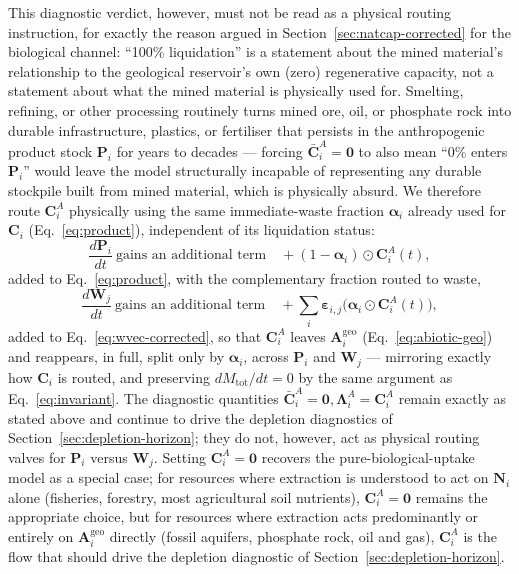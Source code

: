 \documentclass[twocolumn,10pt]{article}
\begin{document}
This diagnostic verdict, however, must not be read as a physical routing instruction, for exactly the reason argued in Section~\ref{sec:natcap-corrected} for the biological channel: ``100\% liquidation'' is a statement about the mined material's relationship to the geological reservoir's own (zero) regenerative capacity, not a statement about what the mined material is physically used for. Smelting, refining, or other processing routinely turns mined ore, oil, or phosphate rock into durable infrastructure, plastics, or fertiliser that persists in the anthropogenic product stock $\mathbf P_i$ for years to decades — forcing $\bar{\mathbf C}^A_i=\mathbf 0$ to also mean ``0\% enters $\mathbf P_i$'' would leave the model structurally incapable of representing any durable stockpile built from mined material, which is physically absurd. We therefore route $\mathbf C^A_i$ physically using the same immediate-waste fraction $\boldsymbol\alpha_i$ already used for $\mathbf C_i$ (Eq.~\eqref{eq:product}), independent of its liquidation status:
\[
\frac{d\mathbf P_i}{dt}\ \text{gains an additional term}\quad +(1-\boldsymbol\alpha_i)\odot\mathbf C^A_i(t),
\]
added to Eq.~\eqref{eq:product}, with the complementary fraction routed to waste,
\[
\frac{d\mathbf W_j}{dt}\ \text{gains an additional term}\quad +\sum_i\boldsymbol\varepsilon_{i,j}\bigl(\boldsymbol\alpha_i\odot\mathbf C^A_i(t)\bigr),
\]
added to Eq.~\eqref{eq:wvec-corrected}, so that $\mathbf C^A_i$ leaves $\mathbf A^{\text{geo}}_i$ (Eq.~\eqref{eq:abiotic-geo}) and reappears, in full, split only by $\boldsymbol\alpha_i$, across $\mathbf P_i$ and $\mathbf W_j$ — mirroring exactly how $\mathbf C_i$ is routed, and preserving $dM_{\text{tot}}/dt=0$ by the same argument as Eq.~\eqref{eq:invariant}. The diagnostic quantities $\bar{\mathbf C}^A_i=\mathbf 0,\boldsymbol\Lambda^A_i=\mathbf C^A_i$ remain exactly as stated above and continue to drive the depletion diagnostics of Section~\ref{sec:depletion-horizon}; they do not, however, act as physical routing valves for $\mathbf P_i$ versus $\mathbf W_j$. Setting $\mathbf C^A_i=\mathbf 0$ recovers the pure-biological-uptake model as a special case; for resources where extraction is understood to act on $\mathbf N_i$ alone (fisheries, forestry, most agricultural soil nutrients), $\mathbf C^A_i=\mathbf 0$ remains the appropriate choice, but for resources where extraction acts predominantly or entirely on $\mathbf A^{\text{geo}}_i$ directly (fossil aquifers, phosphate rock, oil and gas), $\mathbf C^A_i$ is the flow that should drive the depletion diagnostic of Section~\ref{sec:depletion-horizon}.
\end{document}
